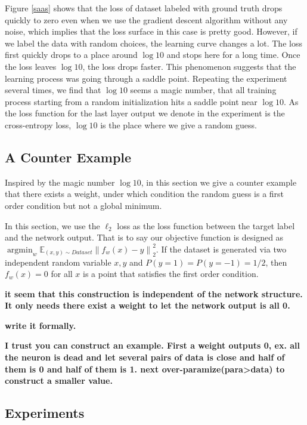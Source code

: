 \documentclass{article}
\theoremstyle{plain}
\theoremstyle{definition}
\DeclareMathOperator*{\argmin}{argmin}
\begin{document}
Figure \ref{saas} shows that the loss of dataset labeled with ground truth drops quickly to zero even when we use the gradient descent algorithm without any noise, which implies that the loss surface in this case is pretty good. However, if we label the data with random choices, the learning curve changes a lot. The loss first quickly drops to a place around $\log 10$ and stops here for a long time. Once the loss leaves $\log 10$, the loss drops faster. This phenomenon suggests that the learning process was going through a saddle point. Repeating the experiment several times, we find that $\log10$ seems a magic number, that all training process starting from a random initialization hits a saddle point near $\log 10$. As the loss function for the last layer output we denote in the experiment is the cross-entropy loss, $\log 10$ is the place where we give a random guess.


\subsection{A Counter Example}

Inspired by the magic number $\log 10$, in this section we give a counter example that there exists a weight, under which condition the random guess is a first order condition but not a global minimum.

In this section, we use the $\ell_2$ loss as the loss function between the target label and the network output. That is to say our objective function is designed as $\argmin_w\mathbb{E}_{(x,y)\sim Dataset}\left\|f_w(x)-y\right\|_2^2$. If the dataset is generated via two independent random variable $x,y$ and $P(y=1)=P(y=-1)=1/2$, then $f_w(x)=0$ for all $x$ is a point that satisfies the first order condition.


\textbf{it seem that this construction is independent of the network structure. It only needs there exist a weight to let the network output is all 0.}

\textbf{write it formally.}

\textbf{I trust you can construct an example. First a weight outputs 0, ex. all the neuron is dead and let several pairs of data is close and half of them is 0 and half of them is 1. next over-paramize(para>data) to construct a smaller value.}

\subsection{Experiments}
\end{document}
